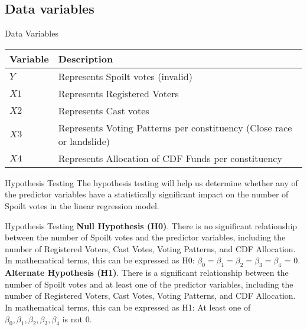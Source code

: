 \documentclass{beamer}
\begin{document}
\subsection{Data variables}


\begin{frame}[fragile]{Data Variables}
  \begin{table}
    \centering
    \small
    \begin{tabular}{|p{}|p{}|}
      \hline
      \textbf{Variable} & \textbf{Description} \\
      \hline
      $Y$ & Represents Spoilt votes (invalid) \\
      \hline
      $X1$ & Represents Registered Voters \\
      \hline
      $X2$ & Represents Cast votes \\
      \hline
      $X3$ & Represents Voting Patterns per constituency (Close race or landslide) \\
      \hline
      $X4$ & Represents Allocation of CDF Funds per constituency \\
      \hline
    \end{tabular}
  \end{table}
\end{frame}


\begin{frame}{Hypothesis Testing}
The hypothesis testing will help us determine whether any of the predictor variables have a statistically significant impact on the number of Spoilt votes in the linear regression model.
\end{frame}

\begin{frame}{Hypothesis Testing}
\textbf{Null Hypothesis (H0)}. There is no significant relationship between the number of Spoilt votes and the predictor variables, including the number of Registered Voters, Cast Votes, Voting Patterns, and CDF Allocation. In mathematical terms, this can be expressed as H0: $\beta_0 = \beta_1 = \beta_2 = \beta_3 = \beta_4$ = 0.\\
\textbf{Alternate Hypothesis (H1)}. There is a significant relationship between the number of Spoilt votes and at least one of the predictor variables, including the number of Registered Voters, Cast Votes, Voting Patterns, and CDF Allocation. In mathematical terms, this can be expressed as H1: At least one of $\beta_0, \beta_1, \beta_2, \beta_3, \beta_4$ is not 0.
\end{frame}
\end{document}
